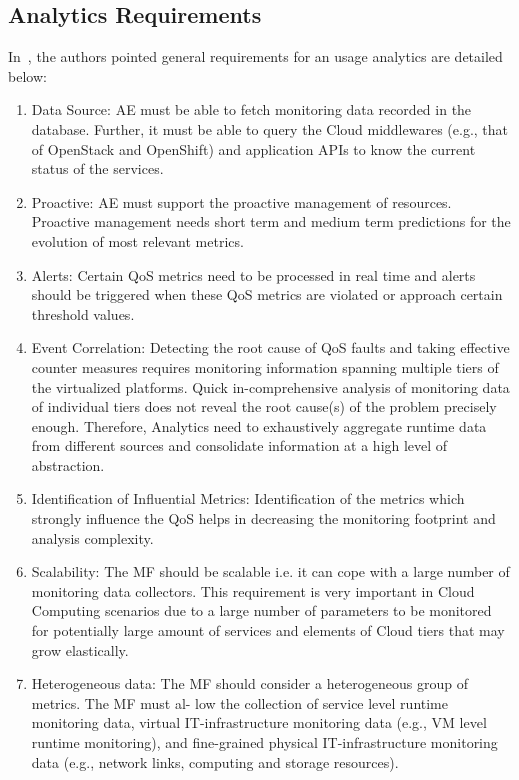 \subsection{Analytics Requirements}

In~\cite{Paper2013}, the authors pointed general requirements for an usage analytics are detailed below:
\begin{enumerate}
\item Data Source: AE must be able to fetch monitoring data recorded in the database. Further, it must be able to query the Cloud middlewares (e.g., that of OpenStack and OpenShift) and application APIs to know the current status of the services. 	
\item Proactive: AE must support the proactive management of resources. Proactive management needs short term and medium term predictions for the evolution of most relevant metrics. 
\item Alerts: Certain QoS metrics need to be processed in real time and alerts should be triggered when these QoS metrics are violated or approach certain threshold values. 
\item Event Correlation: Detecting the root cause of QoS faults and taking effective counter measures requires monitoring information spanning multiple tiers of the virtualized platforms. Quick in-comprehensive analysis of monitoring data of individual tiers does not reveal the root cause(s) of the problem precisely enough. Therefore, Analytics need to exhaustively aggregate runtime data from different sources and consolidate information at a high level of abstraction. 
\item Identification of Influential Metrics: Identification of the metrics which strongly influence the QoS helps in decreasing the monitoring footprint and analysis complexity.
\item Scalability: The MF should be scalable i.e. it can cope with a large number of monitoring data collectors. This requirement is very important in Cloud Computing scenarios due to a large number of parameters to be monitored for potentially large amount of services and elements of Cloud tiers that may grow elastically. 
\item Heterogeneous data: The MF should consider a heterogeneous group of metrics. The MF must al- low the collection of service level runtime monitoring data, virtual IT-infrastructure monitoring data (e.g., VM level runtime monitoring), and fine-grained physical IT-infrastructure monitoring data (e.g., network links, computing and storage resources). 

\end{enumerate}
